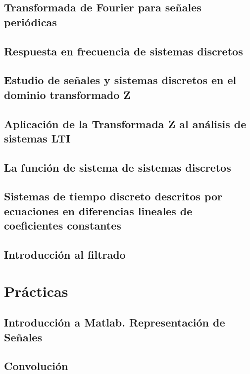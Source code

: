 \documentclass[a4paper]{book}
\begin{document}
\section{Transformada de Fourier para señales periódicas}

\section{Respuesta en frecuencia de sistemas discretos}

\section{Estudio de señales y sistemas discretos en el dominio transformado Z}

\section{Aplicación de la Transformada Z al análisis de sistemas LTI}

\section{La función de sistema de sistemas discretos}

\section{Sistemas de tiempo discreto descritos por ecuaciones en diferencias lineales de coeficientes constantes}

\section{Introducción al filtrado}


\chapter{Prácticas}

\section{Introducción a Matlab. Representación de Señales}

\section{Convolución}
\end{document}
